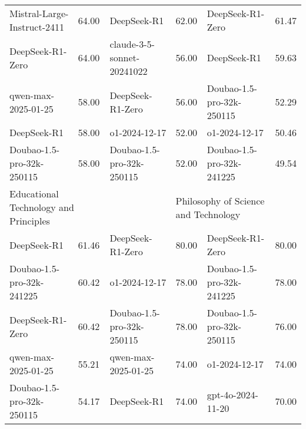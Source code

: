 {\begin{longtable}{p{4.2cm}>{\centering\arraybackslash} p{0.8cm}|p{4.2cm} >{\centering\arraybackslash} p{0.8cm}|p{4.2cm} >{\centering\arraybackslash} p{0.8cm}}
\hline
\cellcolor{pink!5} Mistral-Large-Instruct-2411 & \cellcolor{pink!2}64.00 & \cellcolor{blue!5} DeepSeek-R1 & \cellcolor{blue!2} 62.00 & \cellcolor{lime!5} DeepSeek-R1-Zero & \cellcolor{lime!2} 61.47\\
\cellcolor{pink!5} DeepSeek-R1-Zero & \cellcolor{pink!2}64.00 & \cellcolor{blue!5} claude-3-5-sonnet-20241022 & \cellcolor{blue!2} 56.00 & \cellcolor{lime!5} DeepSeek-R1 & \cellcolor{lime!2} 59.63\\
\cellcolor{pink!5} qwen-max-2025-01-25 & \cellcolor{pink!2}58.00 & \cellcolor{blue!5} DeepSeek-R1-Zero & \cellcolor{blue!2} 56.00 & \cellcolor{lime!5} Doubao-1.5-pro-32k-250115 & \cellcolor{lime!2} 52.29\\
\cellcolor{pink!5} DeepSeek-R1 & \cellcolor{pink!2}58.00 & \cellcolor{blue!5} o1-2024-12-17 & \cellcolor{blue!2} 52.00 & \cellcolor{lime!5} o1-2024-12-17 & \cellcolor{lime!2} 50.46\\
\cellcolor{pink!5} Doubao-1.5-pro-32k-250115 & \cellcolor{pink!2}58.00 & \cellcolor{blue!5} Doubao-1.5-pro-32k-250115 & \cellcolor{blue!2} 52.00 & \cellcolor{lime!5} Doubao-1.5-pro-32k-241225 & \cellcolor{lime!2} 49.54\\
\hline
\multicolumn{2}{p{5.15cm}|}{\cellcolor{cyan!10} \centering Educational Technology and Principles} & \multicolumn{2}{p{5.15cm}|}{\cellcolor{blue!10} \centering Textile Materials Science} & \multicolumn{2}{p{5.15cm}}{\cellcolor{lime!10} \centering Philosophy of Science and Technology}\\
\hline
\cellcolor{cyan!5} DeepSeek-R1 & \cellcolor{cyan!2}61.46 & \cellcolor{blue!5} DeepSeek-R1-Zero & \cellcolor{blue!2} 80.00 & \cellcolor{lime!5} DeepSeek-R1-Zero & \cellcolor{lime!2} 80.00\\
\cellcolor{cyan!5} Doubao-1.5-pro-32k-241225 & \cellcolor{cyan!2}60.42 & \cellcolor{blue!5} o1-2024-12-17 & \cellcolor{blue!2} 78.00 & \cellcolor{lime!5} Doubao-1.5-pro-32k-241225 & \cellcolor{lime!2} 78.00\\
\cellcolor{cyan!5} DeepSeek-R1-Zero & \cellcolor{cyan!2}60.42 & \cellcolor{blue!5} Doubao-1.5-pro-32k-250115 & \cellcolor{blue!2} 78.00 & \cellcolor{lime!5} Doubao-1.5-pro-32k-250115 & \cellcolor{lime!2} 76.00\\
\cellcolor{cyan!5} qwen-max-2025-01-25 & \cellcolor{cyan!2}55.21 & \cellcolor{blue!5} qwen-max-2025-01-25 & \cellcolor{blue!2} 74.00 & \cellcolor{lime!5} o1-2024-12-17 & \cellcolor{lime!2} 74.00\\
\cellcolor{cyan!5} Doubao-1.5-pro-32k-250115 & \cellcolor{cyan!2}54.17 & \cellcolor{blue!5} DeepSeek-R1 & \cellcolor{blue!2} 74.00 & \cellcolor{lime!5} gpt-4o-2024-11-20 & \cellcolor{lime!2} 70.00\\

\end{longtable}}

